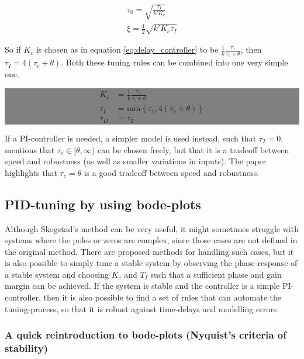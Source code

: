 \begin{align}
    \tau_0 = \sqrt{\frac{\tau_I}{k' K_c}}\\
    \xi = \frac{1}{2} \sqrt{k' K_c \tau_I}
\end{align}

\noindent
So if $K_c$  is chosen as in equation \ref{eq:delay_controller} to be $ \frac{1}{k} \frac{\tau_1}{\tau_c + \theta} $, then $\tau_I = 4\left(\tau_c + \theta \right)$. Both these tuning rules can be combined into one very simple one. 

\colorbox{gray}{\begin{minipage}{\textwidth}
\begin{align}
    \label{eq:SIMC_simple_tuning_rule}
    K_c     &= \frac{1}{k} \frac{\tau_1}{\tau_c + \theta}\\
    \tau_I  &= \text{min} \left\{ \tau_1, 4 \left( \tau_c + \theta \right)\right\}\\
    \tau_D  &= \tau_2
\end{align}
\end{minipage}}

\noindent
If a PI-controller is needed, a simpler model is used instead, such that $\tau_2 =0$. \cite{SIMC_source} mentions that $\tau_c \in [\theta , \infty)$ can be chosen freely, but that it is a tradeoff between speed and robustness (as well as smaller variations in inputs). The paper highlights that $\tau_c = \theta$ is a good tradeoff between speed and robustness. 


   



\subsection{PID-tuning by using bode-plots}


Although Skogstad's method can be very useful, it might sometimes struggle with systems where the poles or zeros are complex, since those cases are not defined in the original method. There are proposed methods for handling such cases, but it is also possible to simply tune a stable system by observing the phase-response of a stable system and choosing $K_{c}$ and $T_{I}$ such that a sufficient phase and gain margin can be achieved. If the system is stable and the controller is a simple PI-controller, then it is also possible to find a set of rules that can automate the tuning-process, so that it is robust against time-delays and modelling errors.

\subsubsection{A quick reintroduction to bode-plots (Nyquist's criteria of stability)}

